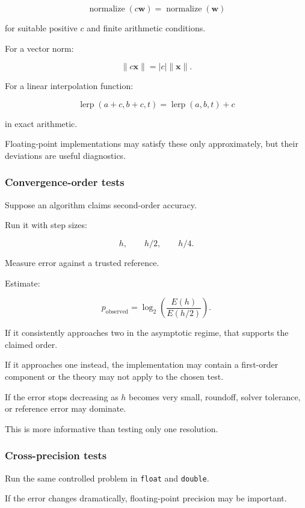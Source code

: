 \[ \boxed{ \operatorname{normalize}(c\mathbf w) = \operatorname{normalize}(\mathbf w) } \]

for suitable positive \(c\) and finite arithmetic conditions.

For a vector norm:

\[ \boxed{ \|c\mathbf x\|=|c|\|\mathbf x\| }. \]

For a linear interpolation function:

\[ \boxed{ \operatorname{lerp}(a+c,b+c,t) = \operatorname{lerp}(a,b,t)+c } \]

in exact arithmetic.

Floating-point implementations may satisfy these only approximately, but their deviations are useful diagnostics.

\subsubsection{Convergence-order tests}\label{02-foundations-ii-ch031-convergence-order-tests}

Suppose an algorithm claims second-order accuracy.

Run it with step sizes:

\[ h,\qquad h/2,\qquad h/4. \]

Measure error against a trusted reference.

Estimate:

\[ p_{\mathrm{observed}} = \log_2 \left( \frac{E(h)}{E(h/2)} \right). \]

If it consistently approaches two in the asymptotic regime, that supports the claimed order.

If it approaches one instead, the implementation may contain a first-order component or the theory may not apply to the chosen test.

If the error stops decreasing as \(h\) becomes very small, roundoff, solver tolerance, or reference error may dominate.

This is more informative than testing only one resolution.

\subsubsection{Cross-precision tests}\label{02-foundations-ii-ch031-cross-precision-tests}

Run the same controlled problem in \texttt{float} and \texttt{double}.

If the error changes dramatically, floating-point precision may be important.

